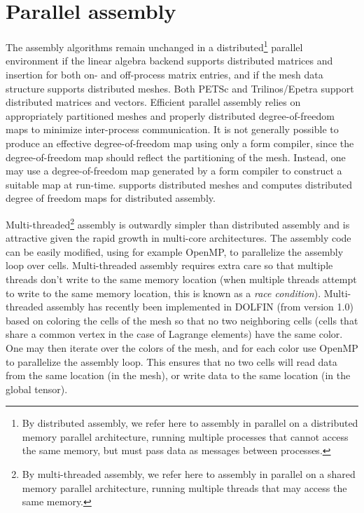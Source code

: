 \section{Parallel assembly}

The assembly algorithms remain unchanged in a distributed\footnote{By
  distributed assembly, we refer here to assembly in parallel on a
  distributed memory parallel architecture, running multiple processes
  that cannot access the same memory, but must pass data as messages
  between processes.} parallel environment if the linear algebra
backend supports distributed matrices and insertion for both on- and
off-process matrix entries, and if the mesh data structure supports
distributed meshes. Both PETSc
\citep{BalayBuschelmanGroppEtAl2001,BalayBuschelmanEijkhoutEtAl2004}
and Trilinos/Epetra \citep{HerouxBartlettHowleEtAl2005} support
distributed matrices and vectors. Efficient parallel assembly relies
on appropriately partitioned meshes and properly distributed
degree-of-freedom maps to minimize inter-process communication.  It is
not generally possible to produce an effective degree-of-freedom map
using only a form compiler, since the degree-of-freedom map should
reflect the partitioning of the mesh. Instead, one may use a
degree-of-freedom map generated by a form compiler to construct a
suitable map at run-time.  \dolfin{} supports distributed meshes and
computes distributed degree of freedom maps for distributed assembly.

Multi-threaded\footnote{By multi-threaded assembly, we refer here to
  assembly in parallel on a shared memory parallel architecture,
  running multiple threads that may access the same memory.} assembly
  is outwardly simpler than distributed assembly and is attractive
  given the rapid growth in multi-core architectures. The assembly
  code can be easily modified, using for example OpenMP, to
  parallelize the assembly loop over cells. Multi-threaded assembly
  requires extra care so that multiple threads don't write to the same
  memory location (when multiple threads attempt to write to the same
  memory location, this is known as a \emph{race condition}).
  Multi-threaded assembly has recently been implemented in DOLFIN
  (from version 1.0) based on coloring the cells of the mesh so that
  no two neighboring cells (cells that share a common vertex in the
  case of Lagrange elements) have the same color. One may then iterate
  over the colors of the mesh, and for each color use OpenMP to
  parallelize the assembly loop. This ensures that no two cells will
  read data from the same location (in the mesh), or write data to
  the same location (in the global tensor).

